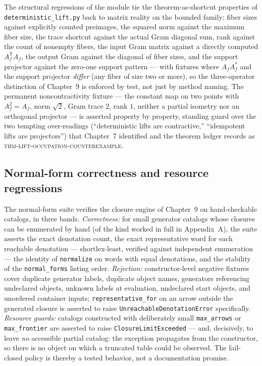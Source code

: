 The structural regressions of the module tie the theorem-as-shortcut
properties of \texttt{deterministic\_lift.py} back to matrix reality on
the bounded family: fiber sizes against explicitly counted preimages, the
squared norm against the maximum fiber size, the trace shortcut against
the actual Gram diagonal sum, rank against the count of nonempty fibers,
the input Gram matrix against a directly computed $A_f^{\mathsf T} A_f$,
the output Gram against the diagonal of fiber sizes, and the support
projector against the zero-one support pattern --- with fixtures where
$A_f A_f^{*}$ and the support projector \emph{differ} (any fiber of size
two or more), so the three-operator distinction of Chapter~9 is enforced
by test, not just by method naming. The permanent noncontractivity fixture
--- the constant map on two points with $A_f^2 = A_f$, norm $\sqrt 2$,
Gram trace $2$, rank $1$, neither a partial isometry nor an orthogonal
projector --- is asserted property by property, standing guard over the
two tempting over-readings (``deterministic lifts are contractive,''
``idempotent lifts are projectors'') that Chapter~7 identified and the
theorem ledger records as \textsc{thm-lift-occupation-counterexample}.

\subsection{Normal-form correctness and resource regressions}\label{ch10:sec:nf-suite}

The normal-form suite verifies the closure engine of Chapter~9 on
hand-checkable catalogs, in three bands. \emph{Correctness:} for small
generator catalogs whose closures can be enumerated by hand (of the kind
worked in full in Appendix~A), the suite asserts the exact denotation
count, the exact representative word for each reachable denotation ---
shortlex-least, verified against independent enumeration --- the identity
of \texttt{normalize} on words with equal denotations, and the stability
of the \texttt{normal\_forms} listing order. \emph{Rejection:}
constructor-level negative fixtures cover duplicate generator labels,
duplicate object names, generators referencing undeclared objects, unknown
labels at evaluation, undeclared start objects, and unordered container
inputs; \texttt{representative\_for} on an arrow outside the generated
closure is asserted to raise \texttt{UnreachableDenotationError}
specifically. \emph{Resource guards:} catalogs constructed with
deliberately small \texttt{max\_arrows} or \texttt{max\_frontier} are
asserted to raise \texttt{ClosureLimitExceeded} --- and, decisively, to
leave \emph{no} accessible partial catalog: the exception propagates from
the constructor, so there is no object on which a truncated table could
be observed. The fail-closed policy is thereby a tested behavior, not a
documentation promise.

